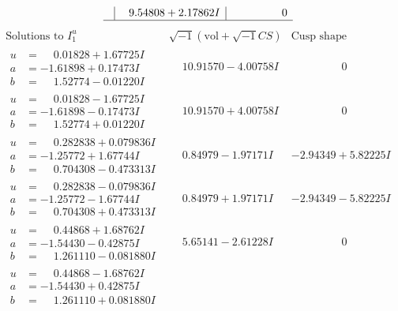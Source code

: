 \documentclass[1p]{elsarticle_modified}
\theoremstyle{definition}
\newcommand{\I}{\sqrt{-1}}
\begin{document}
$$\begin{array}{c|c|c}
 & \phantom{-}9.54808 + 2.17862 I & \phantom{-0.000000 } 0\\
 \hline 
 \end{array}$$\newpage$$\begin{array}{c|c|c}  
\text{Solutions to }I^u_{1}& \I (\text{vol} + \sqrt{-1}CS) & \text{Cusp shape}\\
 \hline 
\begin{aligned}
u &= \phantom{-}0.01828 + 1.67725 I \\
a &= -1.61898 + 0.17473 I \\
b &= \phantom{-}1.52774 - 0.01220 I\end{aligned}
 & \phantom{-}10.91570 - 4.00758 I & \phantom{-0.000000 } 0 \\ \hline\begin{aligned}
u &= \phantom{-}0.01828 - 1.67725 I \\
a &= -1.61898 - 0.17473 I \\
b &= \phantom{-}1.52774 + 0.01220 I\end{aligned}
 & \phantom{-}10.91570 + 4.00758 I & \phantom{-0.000000 } 0 \\ \hline\begin{aligned}
u &= \phantom{-}0.282838 + 0.079836 I \\
a &= -1.25772 + 1.67744 I \\
b &= \phantom{-}0.704308 - 0.473313 I\end{aligned}
 & \phantom{-}0.84979 - 1.97171 I & -2.94349 + 5.82225 I \\ \hline\begin{aligned}
u &= \phantom{-}0.282838 - 0.079836 I \\
a &= -1.25772 - 1.67744 I \\
b &= \phantom{-}0.704308 + 0.473313 I\end{aligned}
 & \phantom{-}0.84979 + 1.97171 I & -2.94349 - 5.82225 I \\ \hline\begin{aligned}
u &= \phantom{-}0.44868 + 1.68762 I \\
a &= -1.54430 - 0.42875 I \\
b &= \phantom{-}1.261110 - 0.081880 I\end{aligned}
 & \phantom{-}5.65141 - 2.61228 I & \phantom{-0.000000 } 0 \\ \hline\begin{aligned}
u &= \phantom{-}0.44868 - 1.68762 I \\
a &= -1.54430 + 0.42875 I \\
b &= \phantom{-}1.261110 + 0.081880 I\end{aligned}

\end{array}$$
\end{document}
